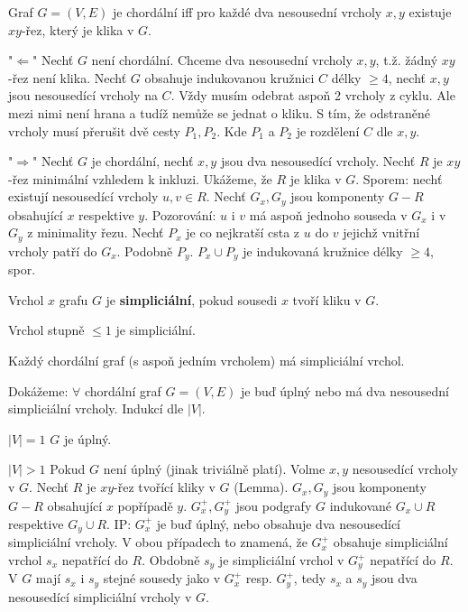 \begin{lemma}
	Graf $G= (V,E)$ je chordální iff pro každé dva nesousední vrcholy $x,y$ existuje $xy$-řez, který je klika v $G$.
\end{lemma}

\begin{dukaz}
	"$\Leftarrow$" Nechť $G$ není chordální. Chceme dva nesousední vrcholy $x,y$, t.ž. žádný $xy$-řez není klika. Nechť $G$ obsahuje indukovanou kružnici $C$ délky $\geq 4$, nechť $x,y$ jsou nesousedící vrcholy na $C$. Vždy musím odebrat aspoň 2 vrcholy z cyklu. Ale mezi nimi není hrana a tudíž nemůže se jednat o kliku. S tím, že odstraněné vrcholy musí přerušit dvě cesty $P_{1}, P_{2}$. Kde $P_{1}$ a $P_{2}$ je rozdělení $C$ dle $x,y$.
	
	"$\Rightarrow$" Nechť $G$ je chordální, nechť $x,y$ jsou dva nesousedící vrcholy. Nechť $R$ je $xy$-řez minimální vzhledem k inkluzi. Ukážeme, že $R$ je klika v $G$. Sporem: nechť existují nesousedící vrcholy $u,v \in R$. Nechť $G_{x}, G_{y}$ jsou komponenty $G-R$ obsahující $x$ respektive $y$. Pozorování: $u$ i $v$ má aspoň jednoho souseda v $G_{x}$ i v $G_{y}$ z minimality řezu. Nechť $P_{x}$ je co nejkratší csta z $u$ do $v$ jejichž vnitřní vrcholy patří do $G_{x}$. Podobně $P_{y}$. $P_{x} \cup P_{y}$ je indukovaná kružnice délky $\geq 4$, spor.
\end{dukaz}

\begin{definice}
	Vrchol $x$ grafu $G$ je \textbf{simpliciální}, pokud sousedi $x$ tvoří kliku v $G$.
\end{definice}

\begin{pozor}
	Vrchol stupně $\leq 1$ je simpliciální.
\end{pozor}

\begin{lemma}
	Každý chordální graf (s aspoň jedním vrcholem) má simpliciální vrchol.
\end{lemma}

\begin{dukaz}
	Dokážeme: $\forall$ chordální graf $G = (V,E)$ je buď úplný nebo má dva nesousední simpliciální vrcholy. Indukcí dle $|V|$.
	
	$|V|=1$ $G$ je úplný.
	
	$|V|>1$ Pokud $G$ není úplný (jinak triviálně platí). Volme $x,y$ nesousedící vrcholy v $G$. Nechť $R$ je $xy$-řez tvořící kliky v $G$ (Lemma). $G_{x}, G_{y}$ jsou komponenty $G-R$ obsahující $x$ popřípadě $y$. $G_{x}^{+},G_{y}^{+}$ jsou podgrafy $G$ indukované $G_{x} \cup R$ respektive $G_{y} \cup R$. IP: $G_{x}^{+}$ je buď úplný, nebo obsahuje dva nesousedící simpliciální vrcholy. V obou případech to znamená, že $G_{x}^{+}$ obsahuje simpliciální vrchol $s_{x}$ nepatřící do $R$. Obdobně $s_{y}$ je simpliciální vrchol v $G_{y}^{+}$ nepatřící do $R$. V $G$ mají $s_{x}$ i $s_{y}$ stejné sousedy jako v $G_{x}^{+}$ resp. $G_{y}^{+}$, tedy $s_{x}$ a $s_{y}$ jsou dva nesousedící simpliciální vrcholy v $G$.
\end{dukaz}

